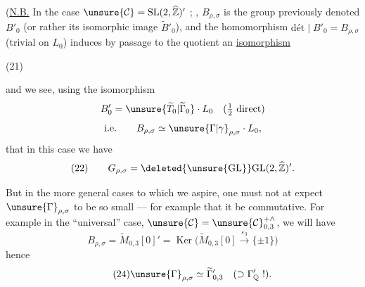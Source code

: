 (\uline{N.B.} In the case $\unsure{\mathcal{C}}=\mathrm{SL}(2,\widehat{\mathbb Z})'$ ;  , $B_{\rho,\sigma}$  is the group previously denoted $B'_0$ (or rather its isomorphic image $\widetilde B'_0$), and the homomorphism $\mathrm{dét}\mid B'_0=B_{\rho,\sigma}$  (trivial on $L_0$) induces by passage to the quotient an \uline{isomorphism}
\begin{samepage}
\hfill(21)
\end{samepage}
and we see,  using the isomorphism
\[
B'_0=\unsure{\widetilde T_0|\widetilde\Gamma_0}\cdot L_0\quad(\tfrac12\text{ direct})
\]
\[
\text{i.e.}\qquad B_{\rho,\sigma}\simeq\unsure{\Gamma|\gamma}_{\rho,\sigma}\cdot L_0,
\]
that in this case we have
\[
(22)\qquad G_{\rho,\sigma}=\deleted{\unsure{\mathrm{GL}}}\mathrm{GL}(2,\widehat{\mathbb Z})'.
\]


But in the more general cases to which we aspire, one must not at  expect $\unsure{\Gamma}_{\rho,\sigma}$ to be so small --- for example that it be commutative.
For example in the ``universal'' case, $\unsure{\mathcal{C}}=\unsure{\mathcal{C}}_{0,3}^{+\wedge}$, we will have
\[
\tag{23}
B_{\rho,\sigma}=\widetilde{M}_{0,3}[0]'=
\operatorname{Ker}\bigl(\widetilde{M}_{0,3}[0]\xrightarrow{\varepsilon_3}\{\pm1\}\bigr)
\]
hence
\[
\tag{24}
\unsure{\Gamma}_{\rho,\sigma}\simeq\widetilde{\Gamma}_{0,3}'
\quad(\supset\Gamma_{\mathbb{Q}}'\ !).
\]

